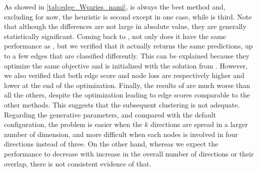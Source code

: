 As showed in \autoref{tab:edge_Wvaries_nami}, \combined{} is always the best method and, excluding
\pqt{} for now, the \lloyd{} heuristic is second except in one case, while \kmeans{} is third. Note
that although the differences are not large in absolute value, they are generally statistically
significant. Coming back to \pqt{}, not only does it have the same performance as \combined{}, but
we verified that it actually returns the same predictions, up to a few edges that are classified
differently. This can be explained because they optimize the same objective and \pqt{} is
initialized with the solution from \combined{}. However, we also verified that both edge score and
node loss are respectively higher and lower at the end of the optimization. Finally, the results of
\fwa{} are much worse than all the others, despite the optimization leading to edge scores
comparable to the other methods. This suggests that the subsequent clustering is not
adequate. Regarding the generative parameters, and compared with the default configuration, the
problem is easier when the $k$ directions are spread in a larger number of dimension, and more
difficult when each nodes is involved in four directions instead of three. On the other hand,
whereas we expect the performance to decrease with increase in the overall number of directions or
their overlap, there is not consistent evidence of that.

